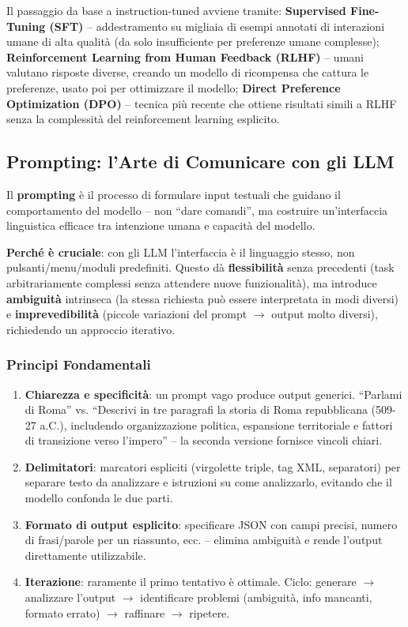 \documentclass[12pt,a4paper]{article}
\begin{document}
Il passaggio da base a instruction-tuned avviene tramite: \textbf{Supervised Fine-Tuning (SFT)} -- addestramento su migliaia di esempi annotati di interazioni umane di alta qualit\`a (da solo insufficiente per preferenze umane complesse); \textbf{Reinforcement Learning from Human Feedback (RLHF)} -- umani valutano risposte diverse, creando un modello di ricompensa che cattura le preferenze, usato poi per ottimizzare il modello; \textbf{Direct Preference Optimization (DPO)} -- tecnica pi\`u recente che ottiene risultati simili a RLHF senza la complessit\`a del reinforcement learning esplicito.

\subsection{Prompting: l'Arte di Comunicare con gli LLM}

\begin{defbox}
Il \textbf{prompting} \`e il processo di formulare input testuali che guidano il comportamento del modello -- non ``dare comandi'', ma costruire un'interfaccia linguistica efficace tra intenzione umana e capacit\`a del modello.
\end{defbox}

\textbf{Perch\'e \`e cruciale}: con gli LLM l'interfaccia \`e il linguaggio stesso, non pulsanti/menu/moduli predefiniti. Questo d\`a \textbf{flessibilit\`a} senza precedenti (task arbitrariamente complessi senza attendere nuove funzionalit\`a), ma introduce \textbf{ambiguit\`a} intrinseca (la stessa richiesta pu\`o essere interpretata in modi diversi) e \textbf{imprevedibilit\`a} (piccole variazioni del prompt $\to$ output molto diversi), richiedendo un approccio iterativo.

\subsubsection{Principi Fondamentali}

\begin{enumerate}
  \item \textbf{Chiarezza e specificit\`a}: un prompt vago produce output generici. ``Parlami di Roma'' vs. ``Descrivi in tre paragrafi la storia di Roma repubblicana (509-27 a.C.), includendo organizzazione politica, espansione territoriale e fattori di transizione verso l'impero'' -- la seconda versione fornisce vincoli chiari.
  \item \textbf{Delimitatori}: marcatori espliciti (virgolette triple, tag XML, separatori) per separare testo da analizzare e istruzioni su come analizzarlo, evitando che il modello confonda le due parti.
  \item \textbf{Formato di output esplicito}: specificare JSON con campi precisi, numero di frasi/parole per un riassunto, ecc. -- elimina ambiguit\`a e rende l'output direttamente utilizzabile.
  \item \textbf{Iterazione}: raramente il primo tentativo \`e ottimale. Ciclo: generare $\to$ analizzare l'output $\to$ identificare problemi (ambiguit\`a, info mancanti, formato errato) $\to$ raffinare $\to$ ripetere.
\end{enumerate}
\end{document}

